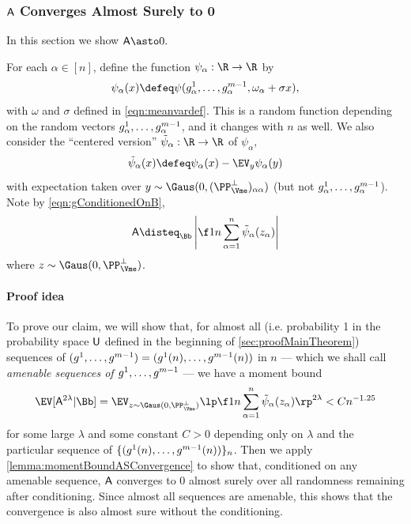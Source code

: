 \documentclass[main.tex]{subfiles}
\begin{document}
 
\subsubsection{\texorpdfstring{$\mathsf{A}$}{A} Converges Almost Surely to 0}
\label{sec:probA}

\newcommand{\rvec}{z}

In this section we show $\probA \asto 0.$

For each $\alpha \in [n]$, define the function $\psi_\alpha: \R \to \R$ by
 \[\psi_\alpha (x) \defeq \psi(g^1_\alpha, \ldots, g^{\MM-1}_\alpha, \omega_\alpha + \sigma x),\]
with $\omega$ and $\sigma$ defined in \cref{eqn:meanvardef}.
This is a random function depending on the random vectors $g^1_\alpha, \ldots, g^{m-1}_\alpha$, and it changes with $n$ as well.
We also consider the ``centered version'' $\tilde \psi_\alpha: \R \to \R$ of $\psi_\alpha,$
\[\tilde \psi_\alpha(x) \defeq \psi_\alpha(x) - \EV_{y}\psi_\alpha(y)\]
with expectation taken over $y \sim \Gaus(0, (\PP^\perp_{\Vme})_{\alpha\alpha})$ (but not $g^1_\alpha, \ldots, g^{m-1}_\alpha$).
Note by \cref{eqn:gConditionedOnB},
\[ \probA \disteq_\Bb \left|\f 1 n \sum_{\alpha =1}^n \tilde \psi_\alpha(\rvec_\alpha)\right|\]
where $\rvec \sim \Gaus(0, \PP_{\Vme}^\perp)$.

\paragraph{Proof idea}
To prove our claim, we will show that, for almost all (i.e. probability 1 in the probability space $\mathsf{U}$ defined in the beginning of \cref{sec:proofMainTheorem}) sequences of $(g^1, \ldots, g^{m-1}) = (g^1(n), \ldots, g^{m-1}(n))$ in $n$ --- which we shall call \emph{amenable sequences of $g^1, \ldots, g^{m-1}$} --- 
we have a moment bound
\begin{equation}
\EV[\probA^{2\lambda} | \Bb] = 
\EV_{\rvec \sim \Gaus(0, \PP^\perp_{\Vme})} 
    \lp \f 1 n \sum_{\alpha =1}^n \tilde \psi_\alpha(\rvec_\alpha)\rp^{2\lambda}
    < C n^{-1.25}
    \label{eqn:highMomentBound}
\end{equation}
for some large $\lambda$ and some constant $C > 0$ depending only on $\lambda$ and the particular sequence of $\{(g^1(n), \ldots, g^{m-1}(n))\}_n$.
Then we apply \cref{lemma:momentBoundASConvergence} to show that, conditioned on any amenable sequence, $\mathsf{A}$ converges to 0 almost surely over all randomness remaining after conditioning.
Since almost all sequences are amenable, this shows that the convergence is also almost sure without the conditioning.
\end{document}
